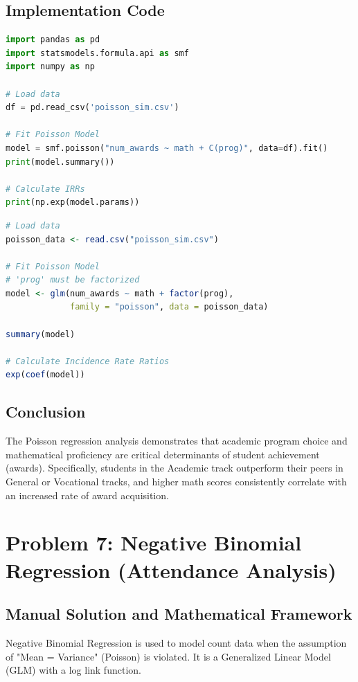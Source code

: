 \documentclass[12pt]{article}
\begin{document}
\subsection{Implementation Code}

\begin{lstlisting}[language=Python, caption=Python implementation for Poisson Regression]
import pandas as pd
import statsmodels.formula.api as smf
import numpy as np

# Load data
df = pd.read_csv('poisson_sim.csv')

# Fit Poisson Model
model = smf.poisson("num_awards ~ math + C(prog)", data=df).fit()
print(model.summary())

# Calculate IRRs
print(np.exp(model.params))
\end{lstlisting}

\begin{lstlisting}[language=R, caption=R implementation for Poisson Regression]
# Load data
poisson_data <- read.csv("poisson_sim.csv")

# Fit Poisson Model
# 'prog' must be factorized
model <- glm(num_awards ~ math + factor(prog), 
             family = "poisson", data = poisson_data)

summary(model)

# Calculate Incidence Rate Ratios
exp(coef(model))
\end{lstlisting}

\subsection{Conclusion}
The Poisson regression analysis demonstrates that academic program choice and mathematical proficiency are critical determinants of student achievement (awards). Specifically, students in the Academic track outperform their peers in General or Vocational tracks, and higher math scores consistently correlate with an increased rate of award acquisition.

\newpage
\section{Problem 7: Negative Binomial Regression (Attendance Analysis)}
\label{prob_nb_attendance}

\subsection{Manual Solution and Mathematical Framework}
Negative Binomial Regression is used to model count data when the assumption of "Mean = Variance" (Poisson) is violated. It is a Generalized Linear Model (GLM) with a log link function.
\end{document}
